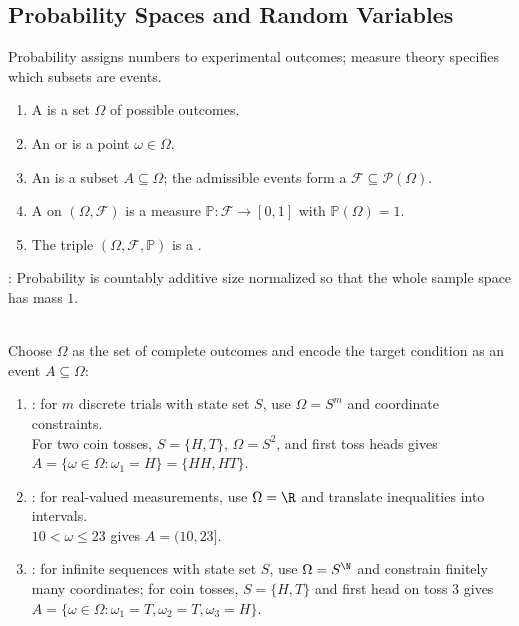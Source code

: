 \subsection{Probability Spaces and Random Variables}

Probability assigns numbers to experimental outcomes; measure theory specifies which subsets are events.

\begin{definition} \label{def:probability-space-random-variable-law}\label{def:sample-space-events-and-probability-space} 
\begin{enumerate}[label=(\roman*)]
\setlength{\itemsep}{0pt}
\item A  is a set $\Omega$ of possible outcomes.
\item An  or  is a point $\omega\in\Omega$.
\item An  is a subset $A\subseteq\Omega$; the admissible events form a  $\mathcal{F}\subseteq\mathcal{P}(\Omega)$.
\item A  on $(\Omega,\mathcal{F})$ is a measure $\mathbb{P}:\mathcal{F}\to[0,1]$ with $\mathbb{P}(\Omega)=1$.
\item The triple $(\Omega,\mathcal{F},\mathbb{P})$ is a .
\end{enumerate}
: Probability is countably additive size normalized so that the whole sample space has mass $1$.
\end{definition}

\begin{method} \label{meth:first-sample-spaces} \\
Choose $\Omega$ as the set of complete outcomes and encode the target condition as an event $A\subseteq\Omega$:
\begin{enumerate}[label=(\roman*)]
\setlength{\itemsep}{0pt}
\item {}: for $m$ discrete trials with state set $S$, use $\Omega=S^m$ and coordinate constraints.\\
For two coin tosses, $S=\{H,T\}$, $\Omega=S^2$, and first toss heads gives $A=\{\omega\in\Omega:\omega_1=H\}=\{HH,HT\}$.
\item {}: for real-valued measurements, use $\Omega=\R$ and translate inequalities into intervals.\\
$10<\omega\leq23$ gives $A=(10,23]$.
\item {}: for infinite sequences with state set $S$, use $\Omega=S^{\N}$ and constrain finitely many coordinates; for coin tosses, $S=\{H,T\}$ and first head on toss $3$ gives $A=\{\omega\in\Omega:\omega_1=T,\omega_2=T,\omega_3=H\}$.
\end{enumerate}
\end{method}

